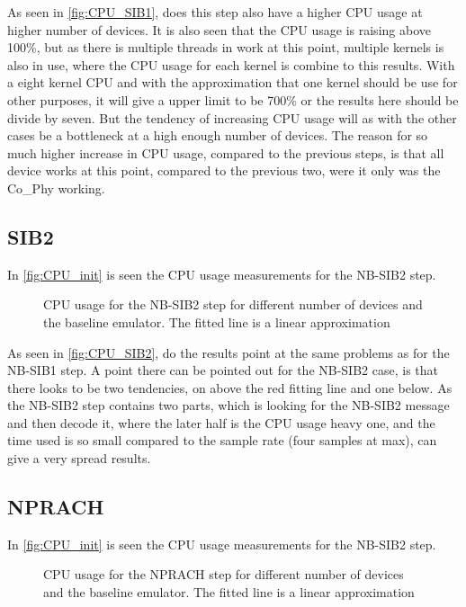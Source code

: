 As seen in \autoref{fig:CPU_SIB1}, does this step also have a higher CPU usage at higher number of devices. It is also seen that the CPU usage is raising above 100\%, but as there is multiple threads in work at this point, multiple kernels is also in use, where the CPU usage for each kernel is combine to this results. With a eight kernel CPU and with the approximation that one kernel should be use for other purposes, it will give a upper limit to be 700\% or the results here should be divide by seven. But the tendency of increasing CPU usage will as with the other cases be a bottleneck at a high enough number of devices. The reason for so much higher increase in CPU usage, compared to the previous steps, is that all device works at this point, compared to the previous two, were it only was the Co\_Phy working.

\subsection{SIB2}
In \autoref{fig:CPU_init} is seen the CPU usage measurements for the NB-SIB2 step.

\begin{figure}[H]
\centering
\resizebox{0.5\textwidth}{!}{
}
\caption{CPU usage for the NB-SIB2 step for different number of devices and the baseline emulator. The fitted line is a linear approximation}
\label{fig:CPU_SIB2}
\end{figure}

As seen in \autoref{fig:CPU_SIB2}, do the results point at the same problems as for the NB-SIB1 step. A point there can be pointed out for the NB-SIB2 case, is that there looks to be two tendencies, on above the red fitting line and one below. As the NB-SIB2 step contains two parts, which is looking for the NB-SIB2 message and then decode it, where the later half is the CPU usage heavy one, and the time used is so small compared to the sample rate (four samples at max), can give a very spread results. 

\subsection{NPRACH}
In \autoref{fig:CPU_init} is seen the CPU usage measurements for the NB-SIB2 step.

\begin{figure}[H]
\centering
\resizebox{0.5\textwidth}{!}{
}
\caption{CPU usage for the NPRACH step for different number of devices and the baseline emulator. The fitted line is a linear approximation}
\label{fig:CPU_NPRACH}
\end{figure}

